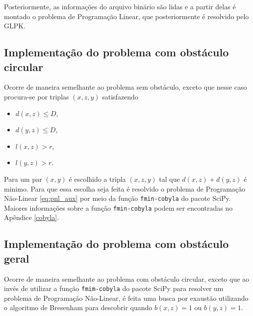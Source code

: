 Posteriormente, as informações do arquivo binário são lidas e a partir delas é
montado o problema de Programação Linear, que posteriormente é resolvido pelo
GLPK.

\subsection{Implementação do problema com obstáculo circular}
Ocorre de maneira semelhante ao problema sem obstáculo, exceto que nesse caso
procura-se por triplas $(x, z, y)$ satisfazendo 
\begin{itemize}
    \item $d(x, z) \leq D$,
    \item $d(y, z) \leq D$,
    \item $l(x, z) > r$,
    \item $l(y, z) > r$.
\end{itemize}

Para um par $(x, y)$ é escolhido a tripla $(x, z, y)$ tal que $d(x, z) + d(y,
z)$ é minimo. Para que essa escolha seja feita é resolvido o problema de
Programação Não-Linear \eqref{eq:pnl_aux} por meio da função
\texttt{fmin-cobyla} do pacote SciPy.  Maiores informações sobre a função
\texttt{fmin-cobyla} podem ser encontradas no Apêndice \ref{cobyla}.

\subsection{Implementação do problema com obstáculo geral}
Ocorre de maneira semelhante ao problema com obstáculo circular, exceto que ao
invés de utilizar a função \texttt{fmim-cobyla} do pacote SciPy para resolver
um problema de Programação Não-Linear, é feita uma busca por exaustão utilizando
o algoritmo de Bresenham para descobrir quando $b(x, z) = 1$ ou $b(y, z) = 1$.
